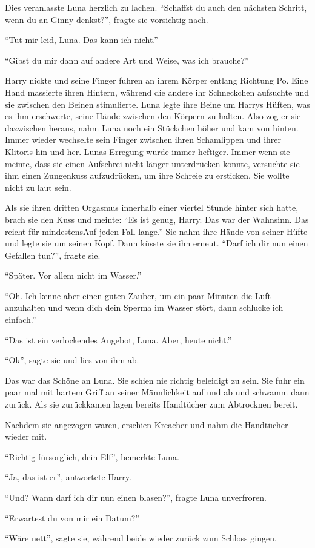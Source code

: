 \begin{abAchtzehn}
Dies veranlasste Luna herzlich zu lachen. \enquote{Schaffst du auch den nächsten Schritt, wenn du an Ginny denkst?}, fragte sie vorsichtig nach.

\enquote{Tut mir leid, Luna. Das kann ich nicht.}

\enquote{Gibst du mir dann auf andere Art und Weise, was ich brauche?}

Harry nickte und seine Finger fuhren an ihrem Körper entlang Richtung Po. Eine Hand massierte ihren Hintern, während die andere ihr Schneckchen aufsuchte und sie zwischen den Beinen stimulierte. Luna legte ihre Beine um Harrys Hüften, was es ihm erschwerte, seine Hände zwischen den Körpern zu halten. Also zog er sie dazwischen heraus, nahm Luna noch ein Stückchen höher und kam von hinten. Immer wieder wechselte sein Finger zwischen ihren Schamlippen und ihrer Klitoris hin und her. Lunas Erregung wurde immer heftiger. Immer wenn sie meinte, dass sie einen Aufschrei nicht länger unterdrücken konnte, versuchte sie ihm einen Zungenkuss aufzudrücken, um ihre Schreie zu ersticken. Sie wollte nicht zu laut sein.

Als sie ihren dritten Orgasmus innerhalb einer viertel Stunde hinter sich hatte, brach sie den Kuss und meinte: \enquote{Es ist genug, Harry. Das war der Wahnsinn. Das reicht für mindestens\abs Auf jeden Fall lange.} Sie nahm ihre Hände von seiner Hüfte und legte sie um seinen Kopf. Dann küsste sie ihn erneut. \enquote{Darf ich dir nun einen Gefallen tun?}, fragte sie.

\enquote{Später. Vor allem nicht im Wasser.}

\enquote{Oh. Ich kenne aber einen guten Zauber, um ein paar Minuten die Luft anzuhalten und wenn dich dein Sperma im Wasser stört, dann schlucke ich einfach.}

\enquote{Das ist ein verlockendes Angebot, Luna. Aber, heute nicht.}

\enquote{Ok}, sagte sie und lies von ihm ab.

Das war das Schöne an Luna. Sie schien nie richtig beleidigt zu sein. Sie fuhr ein paar mal mit hartem Griff an seiner Männlichkeit auf und ab und schwamm dann zurück. Als sie zurückkamen lagen bereits Handtücher zum Abtrocknen bereit.

Nachdem sie angezogen waren, erschien Kreacher und nahm die Handtücher wieder mit.

\enquote{Richtig fürsorglich, dein Elf}, bemerkte Luna.

\enquote{Ja, das ist er}, antwortete Harry.

\enquote{Und? Wann darf ich dir nun einen blasen?}, fragte Luna unverfroren.

\enquote{Erwartest du von mir ein Datum?}

\enquote{Wäre nett}, sagte sie, während beide wieder zurück zum Schloss gingen.

\end{abAchtzehn}

